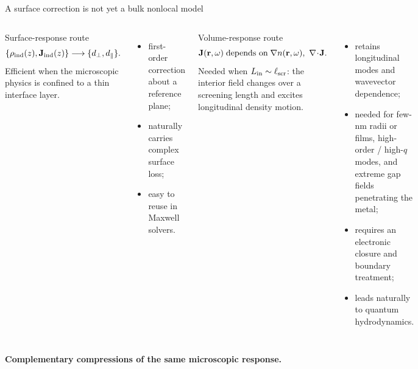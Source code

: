 \documentclass[aspectratio=169,10pt]{beamer}
\newcommand{\key}[1]{\textcolor{teal!80!black}{\textbf{#1}}}
\begin{document}
\begin{frame}{A surface correction is not yet a bulk nonlocal model}
\footnotesize
\begin{columns}[T,onlytextwidth]
  \begin{block}{Surface-response route}
    \[
      \{\rho_{\rm ind}(z),\mathbf J_{\rm ind}(z)\}
      \longrightarrow \{d_\perp,d_\parallel\}.
    \]
    Efficient when the microscopic physics is confined to a thin interface layer.
  \end{block}
  \begin{itemize}
    \item first-order correction about a reference plane;
    \item naturally carries complex surface loss;
    \item easy to reuse in Maxwell solvers.
  \end{itemize}
  \begin{alertblock}{Volume-response route}
    \[
      \mathbf J(\mathbf r,\omega)
      \;\hbox{depends on}\;
      \nabla n(\mathbf r,\omega),\ \nabla\!\cdot\!\mathbf J.
    \]
    Needed when $L_{\rm in}\sim\ell_{\rm scr}$: the interior field changes over a screening length and excites longitudinal density motion.
  \end{alertblock}
  \begin{itemize}
    \item retains longitudinal modes and wavevector dependence;
    \item needed for few-nm radii or films, high-order / high-$q$ modes, and extreme gap fields penetrating the metal;
    \item requires an electronic closure and boundary treatment;
    \item leads naturally to quantum hydrodynamics.
  \end{itemize}
\end{columns}
\vspace{0.1em}
\key{Complementary compressions of the same microscopic response.}
\end{frame}
\end{document}
